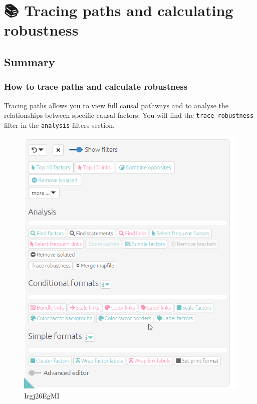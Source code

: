 \documentclass[
]{book}
\begin{document}
\hypertarget{xrobustness}{%
\chapter{📚 Tracing paths and calculating robustness}\label{xrobustness}}

\hypertarget{summary-6}{%
\section{Summary}\label{summary-6}}

\hypertarget{howtotracepathsandrobustness}{%
\subsection{How to trace paths and calculate robustness}\label{howtotracepathsandrobustness}}

Tracing paths allows you to view full causal pathways and to analyse the relationships between specific causal factors. You will find the \texttt{trace\ robustness} filter in the \texttt{analysis} filters section.

\begin{figure}
\centering
\includegraphics[width=6.77083in,height=\textheight]{_assets/Irgj26EgMI.gif}
\caption{Irgj26EgMI}
\end{figure}
\end{document}

